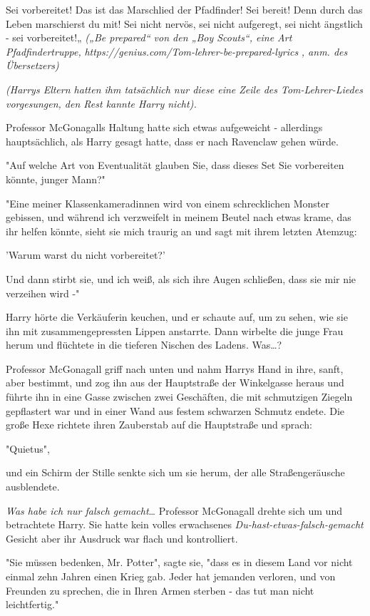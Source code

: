 {Sei vorbereitet! Das ist das Marschlied der Pfadfinder! Sei bereit! Denn durch das Leben marschierst du mit! Sei nicht nervös, sei nicht aufgeregt, sei nicht ängstlich - sei vorbereitet!„ \emph{(„Be prepared“ von den „Boy Scouts“, eine Art Pfadfindertruppe,} \emph{https://genius.com/Tom-lehrer-be-prepared-lyrics} \emph{, anm. des Übersetzers)}

\emph{(Harrys Eltern hatten ihm tatsächlich nur diese eine Zeile des Tom-Lehrer-Liedes vorgesungen, den Rest kannte Harry nicht).}

Professor McGonagalls Haltung hatte sich etwas aufgeweicht - allerdings hauptsächlich, als Harry gesagt hatte, dass er nach Ravenclaw gehen würde.

"Auf welche Art von Eventualität glauben Sie, dass dieses Set Sie vorbereiten könnte, junger Mann?"

"Eine meiner Klassenkameradinnen wird von einem schrecklichen Monster gebissen, und während ich verzweifelt in meinem Beutel nach etwas krame, das ihr helfen könnte, sieht sie mich traurig an und sagt mit ihrem letzten Atemzug:

'Warum warst du nicht vorbereitet?'

Und dann stirbt sie, und ich weiß, als sich ihre Augen schließen, dass sie mir nie verzeihen wird -"

Harry hörte die Verkäuferin keuchen, und er schaute auf, um zu sehen, wie sie ihn mit zusammengepressten Lippen anstarrte. Dann wirbelte die junge Frau herum und flüchtete in die tieferen Nischen des Ladens. Was…?

Professor McGonagall griff nach unten und nahm Harrys Hand in ihre, sanft, aber bestimmt, und zog ihn aus der Hauptstraße der Winkelgasse heraus und führte ihn in eine Gasse zwischen zwei Geschäften, die mit schmutzigen Ziegeln gepflastert war und in einer Wand aus festem schwarzen Schmutz endete. Die große Hexe richtete ihren Zauberstab auf die Hauptstraße und sprach:

"Quietus",

und ein Schirm der Stille senkte sich um sie herum, der alle Straßengeräusche ausblendete.

\emph{Was habe ich nur falsch gemacht}… Professor McGonagall drehte sich um und betrachtete Harry. Sie hatte kein volles erwachsenes \emph{Du-hast-etwas-falsch-gemacht} Gesicht aber ihr Ausdruck war flach und kontrolliert.

"Sie müssen bedenken, Mr. Potter", sagte sie, "dass es in diesem Land vor nicht einmal zehn Jahren einen Krieg gab. Jeder hat jemanden verloren, und von Freunden zu sprechen, die in Ihren Armen sterben - das tut man nicht leichtfertig."

}
